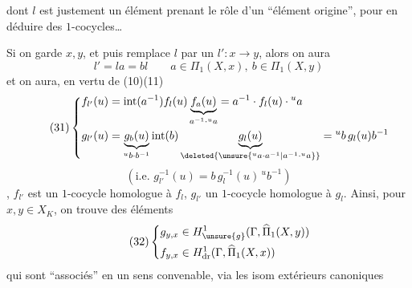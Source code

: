 dont $l$ est justement un élément prenant le rôle d'un ``élément origine'', pour en déduire des $1$-cocycles\ldots


Si on garde $x,y$, et puis remplace $l$ par un $l':x\longrightarrow y$, alors  on aura
\[
l'=la=bl\qquad a\in\Pi_1(X,x),\ b\in\Pi_1(X,y)
\]
et on aura, en vertu de (10)(11)
\[
\tag{31}\left\{\begin{aligned}
f_{l'}(u)&=\operatorname{int}(a^{-1})f_l(u)\underbrace{f_a(u)}_{a^{-1}\cdot{}^ua}=a^{-1}\cdot f_l(u)\cdot{}^ua\\
g_{l'}(u)&=\underbrace{g_b(u)}_{{}^ub\cdot b^{-1}}\operatorname{int}(b)\underbrace{g_l(u)}_{\deleted{\unsure{{}^ua\cdot a^{-1}|a^{-1}\cdot{}^ua}}}={}^ub\,g_l(u)b^{-1}
\end{aligned}\right.
\]
\[
(\text{i.e. }g_{l'}^{-1}(u)=b\,g_l^{-1}(u)\,{}^ub^{-1})
\]
, $f_{l'}$ est un $1$-cocycle  homologue à $f_l$, $g_{l'}$ un $1$-cocycle  homologue à $g_l$. Ainsi, pour $x,y\in X_K$, on trouve des éléments
\[
\tag{32}\left\{\begin{aligned}
g_{y,x}&\in H^1_{\unsure{g}}(\Gamma,\widehat\Pi_1(X,y))\\
f_{y,x}&\in H^1_{\mathrm{dr}}(\Gamma,\widehat\Pi_1(X,x))
\end{aligned}\right.
\]
 qui sont ``associés'' en un sens convenable, via les isom extérieurs canoniques

